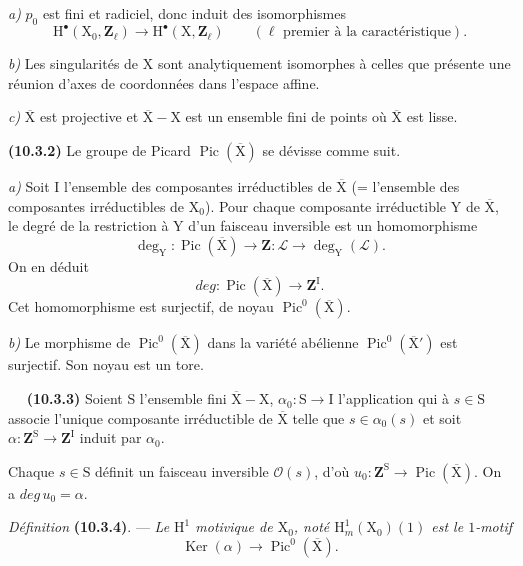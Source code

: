 \documentclass[11pt,leqno]{article}
\newcommand{\Page}[1]{\ifvmode\noindent\else\unskip\ \fi{\footnotesize\textcolor{gray}{[p.\,#1]}}\ \ignorespaces}
\begin{document}
\textit{a)} \(p_0\) est fini et radiciel, donc induit des isomorphismes
\[
\mathrm{H}^{\bullet}(\mathrm{X}_0,\mathbf{Z}_{\ell})
\longrightarrow
\mathrm{H}^{\bullet}(\mathrm{X},\mathbf{Z}_{\ell})
\qquad
(\ell\text{ premier à la caractéristique}).
\]

\textit{b)} Les singularités de \(\mathrm{X}\) sont analytiquement isomorphes à celles que présente une réunion d’axes de coordonnées dans l’espace affine.

\textit{c)} \(\overline{\mathrm{X}}\) est projective et \(\overline{\mathrm{X}}-\mathrm{X}\) est un ensemble fini de points où \(\overline{\mathrm{X}}\) est lisse.

\textbf{(10.3.2)} Le groupe de Picard \(\operatorname{Pic}(\overline{\mathrm{X}})\) se dévisse comme suit.

\textit{a)} Soit \(\mathrm{I}\) l’ensemble des composantes irréductibles de \(\overline{\mathrm{X}}\) (= l’ensemble des composantes irréductibles de \(\mathrm{X}_0\)). Pour chaque composante irréductible \(\mathrm{Y}\) de \(\overline{\mathrm{X}}\), le degré de la restriction à \(\mathrm{Y}\) d’un faisceau inversible est un homomorphisme
\[
\deg_{\mathrm{Y}}:\operatorname{Pic}(\overline{\mathrm{X}})
\longrightarrow\mathbf{Z}:
\mathcal{L}\longrightarrow\deg_{\mathrm{Y}}(\mathcal{L}).
\]
On en déduit
\[
\mathit{deg}:\operatorname{Pic}(\overline{\mathrm{X}})
\longrightarrow\mathbf{Z}^{\mathrm{I}}.
\]
Cet homomorphisme est surjectif, de noyau \(\operatorname{Pic}^{0}(\overline{\mathrm{X}})\).

\textit{b)} Le morphisme de \(\operatorname{Pic}^{0}(\overline{\mathrm{X}})\) dans la variété abélienne \(\operatorname{Pic}^{0}(\overline{\mathrm{X}}')\) est surjectif. Son noyau est un tore.

\Page{70}
\textbf{(10.3.3)} Soient \(\mathrm{S}\) l’ensemble fini \(\overline{\mathrm{X}}-\mathrm{X}\), \(\alpha_0:\mathrm{S}\to\mathrm{I}\) l’application qui à \(s\in\mathrm{S}\) associe l’unique composante irréductible de \(\overline{\mathrm{X}}\) telle que \(s\in\alpha_0(s)\) et soit \(\alpha:\mathbf{Z}^{\mathrm{S}}\to\mathbf{Z}^{\mathrm{I}}\) induit par \(\alpha_0\).

Chaque \(s\in\mathrm{S}\) définit un faisceau inversible \(\mathcal{O}(s)\), d’où \(u_0:\mathbf{Z}^{\mathrm{S}}\to\operatorname{Pic}(\overline{\mathrm{X}})\). On a \(\mathit{deg}\,u_0=\alpha\).

\textit{Définition} \textbf{(10.3.4)}. — \textit{Le \(\mathrm{H}^{1}\) \textup{motivique} de \(\mathrm{X}_0\), noté \(\mathrm{H}^{1}_{m}(\mathrm{X}_0)(1)\) est le \(1\)-motif}
\[
\operatorname{Ker}(\alpha)\longrightarrow
\operatorname{Pic}^{0}(\overline{\mathrm{X}}).
\]
\end{document}
